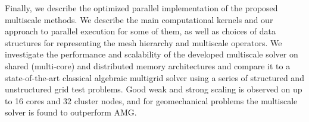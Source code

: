 Finally, we describe the optimized parallel implementation of the proposed multiscale methods.   We describe the main computational kernels and our approach to parallel execution for some of them, as well as choices of data structures for representing the mesh hierarchy and multiscale operators.   We investigate the performance and scalability of the developed multiscale solver on shared (multi-core) and distributed memory architectures and compare it to a state-of-the-art classical algebraic multigrid solver using a series of structured and unstructured grid test problems.   Good weak and strong scaling is observed on up to 16 cores and 32 cluster nodes, and for geomechanical problems the multiscale solver is found to outperform AMG.